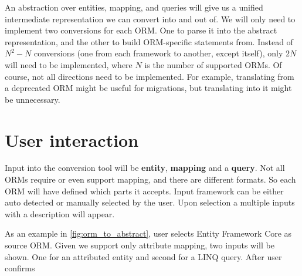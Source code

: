 An abstraction over entities, mapping, and queries will give us a unified intermediate representation we can convert into and out of. We will only need to implement two conversions for each ORM. One to parse it into the abstract representation, and the other to build ORM-specific statements from. Instead of $N^2 - N$ conversions (one from each framework to another, except itself), only $2N$ will need to be implemented, where $N$ is the number of supported ORMs. Of course, not all directions need to be implemented. For example, translating from a deprecated ORM might be useful for migrations, but translating into it might be unnecessary.

\section{User interaction}
Input into the conversion tool will be \textbf{entity}, \textbf{mapping} and a \textbf{query}. Not all ORMs require or even support mapping, and there are different formats. So each ORM will have defined which parts it accepts. Input framework can be either auto detected or manually selected by the user. Upon selection a multiple inputs with a description will appear.

As an example in \autoref{fig:orm_to_abstract}, user selects Entity Framework Core as source ORM. Given we support only attribute mapping, two inputs will be shown. One for an attributed entity and second for a LINQ query. After user confirms 

